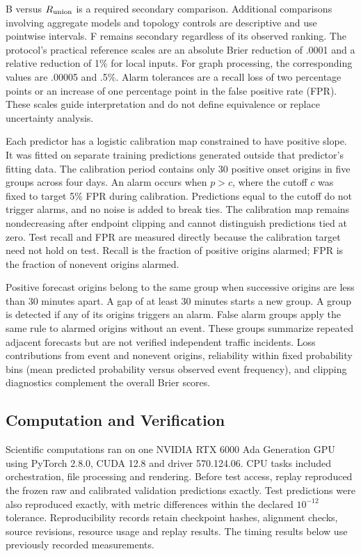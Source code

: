 \documentclass{llncs}
\begin{document}
B versus $R_{\rm union}$ is a required secondary comparison. Additional comparisons involving aggregate models and topology controls are descriptive and use pointwise intervals. F remains secondary regardless of its observed ranking. The protocol's practical reference scales are an absolute Brier reduction of .0001 and a relative reduction of 1\% for local inputs. For graph processing, the corresponding values are .00005 and .5\%. Alarm tolerances are a recall loss of two percentage points or an increase of one percentage point in the false positive rate (FPR). These scales guide interpretation and do not define equivalence or replace uncertainty analysis.

Each predictor has a logistic calibration map constrained to have positive slope. It was fitted on separate training predictions generated outside that predictor's fitting data. The calibration period contains only 30 positive onset origins in five groups across four days. An alarm occurs when $p>c$, where the cutoff $c$ was fixed to target 5\% FPR during calibration. Predictions equal to the cutoff do not trigger alarms, and no noise is added to break ties. The calibration map remains nondecreasing after endpoint clipping and cannot distinguish predictions tied at zero. Test recall and FPR are measured directly because the calibration target need not hold on test. Recall is the fraction of positive origins alarmed; FPR is the fraction of nonevent origins alarmed.

Positive forecast origins belong to the same group when successive origins are less than 30 minutes apart. A gap of at least 30 minutes starts a new group. A group is detected if any of its origins triggers an alarm. False alarm groups apply the same rule to alarmed origins without an event. These groups summarize repeated adjacent forecasts but are not verified independent traffic incidents. Loss contributions from event and nonevent origins, reliability within fixed probability bins (mean predicted probability versus observed event frequency), and clipping diagnostics complement the overall Brier scores.

\subsection{Computation and Verification}
Scientific computations ran on one NVIDIA RTX 6000 Ada Generation GPU using PyTorch 2.8.0, CUDA 12.8 and driver 570.124.06. CPU tasks included orchestration, file processing and rendering. Before test access, replay reproduced the frozen raw and calibrated validation predictions exactly. Test predictions were also reproduced exactly, with metric differences within the declared $10^{-12}$ tolerance. Reproducibility records retain checkpoint hashes, alignment checks, source revisions, resource usage and replay results. The timing results below use previously recorded measurements.
\end{document}
